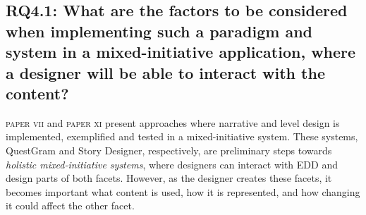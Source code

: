 



\subsection[Research Question 4.1]{RQ4.1: What are the factors to be considered when implementing such a paradigm and system in a mixed-initiative application, where a designer will be able to interact with the content?}


\textsc{paper vii} and \textsc{paper xi} present approaches where narrative and level design is implemented, exemplified and tested in a mixed-initiative system. These systems, QuestGram and Story Designer, respectively, are preliminary steps towards \textit{holistic mixed-initiative systems}, where designers can interact with EDD and design parts of both facets. However, as the designer creates these facets, it becomes important what content is used, how it is represented, and how changing it could affect the other facet.

